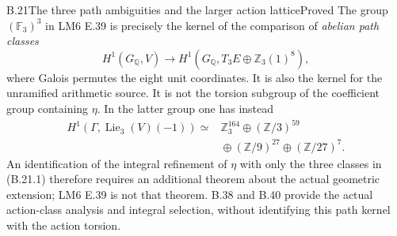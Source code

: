 \begin{statement}{B.21}{The three path ambiguities and the larger action lattice}{Proved}
The group $(\mathbb F_3)^3$ in LM6 E.39 is precisely the
kernel of the comparison of \emph{abelian path classes}
\[
 H^1(G_{\mathbb Q},V)\longrightarrow
 H^1(G_{\mathbb Q},T_3E\oplus\mathbb Z_3(1)^8),
                                                               \tag{B.21.1}
\]
where Galois permutes the eight unit coordinates. It is
also the kernel for the unramified arithmetic source.
It is not the torsion subgroup of the coefficient group
containing $\eta$. In the latter group one has instead
\[
\begin{aligned}
 H^1(\Gamma,\operatorname{Lie}_3(V)(-1))
  \simeq{}&\mathbb Z_3^{164}\oplus(\mathbb Z/3)^{59}\\
           &{}\oplus(\mathbb Z/9)^{27}
                    \oplus(\mathbb Z/27)^7.
\end{aligned}
                                                               \tag{B.21.2}
\]
An identification of the integral refinement of $\eta$
with only the three classes in (B.21.1) therefore requires
an additional theorem about the actual geometric extension;
LM6 E.39 is not that theorem. B.38 and B.40 provide the
actual action-class analysis and integral selection, without
identifying this path kernel with the action torsion.
\end{statement}
